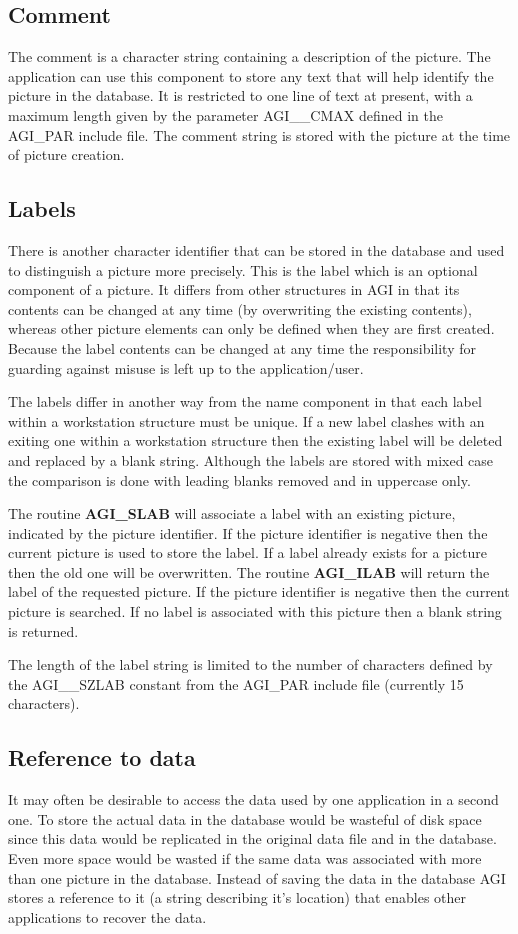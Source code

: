 \subsection{Comment}
The comment is a character string containing a description of the
picture. The application can use this component to store any text that
will help identify the picture in the database.
It is restricted to one line of text at present, with a maximum length
given by the parameter AGI\_\_CMAX defined in the AGI\_PAR include file.
The comment string is stored with the picture at the time of picture creation.

\subsection{Labels}\label{lab}
There is another character identifier that can be stored in the database
and used to distinguish a picture more precisely. This is the label which
is an optional component of a picture.
It differs from other structures in AGI in that its contents can be
changed at any time (by overwriting the existing contents), whereas
other picture elements can only be defined when they are first created.
Because the label contents can be changed at any time the responsibility
for guarding against misuse is left up to the application/user.

The labels differ in another way from the name component in that each
label within a workstation structure must be unique. If a new label clashes
with an exiting one within a workstation structure then the existing label
will be deleted and replaced by a blank string. Although the labels are
stored with mixed case the comparison is done with leading blanks removed
and in uppercase only.

The routine {\bf AGI\_SLAB} will associate a label with an existing picture,
indicated by the picture identifier. If the picture identifier is negative
then the current picture is used to store the label. If a label already
exists for a picture then the old one will be overwritten.
The routine {\bf AGI\_ILAB} will return the label of the requested picture.
If the picture identifier is negative then the current picture is searched.
If no label is associated with this picture then a blank string is returned.

The length of the label string is limited to the number of characters defined
by the AGI\_\_SZLAB constant from the AGI\_PAR include file
(currently 15 characters).

\subsection{Reference to data}
It may often be desirable to access the data used by one application
in a second one. To store the actual data in the database would be wasteful
of disk space since this data would be replicated in the original data file
and in the database. Even more space would be wasted if the same data
was associated with more than one picture in the database. Instead of
saving the data in the database AGI stores a reference to it (a string
describing it's location) that enables other applications to recover the
data.

